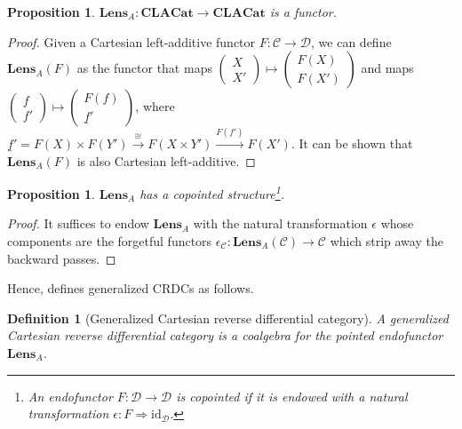 \documentclass[11pt,a4paper,openright,twoside]{report}
\newcounter{mycounter}
\theoremstyle{plain}
\newtheorem{proposition}[mycounter]{Proposition}
\newtheorem{definition}[mycounter]{Definition}
\theoremstyle{definition}
\begin{document}
\begin{proposition}
  $\mathbf{Lens}_A: \mathbf{CLACat} \to \mathbf{CLACat}$ is a functor.
\end{proposition}
\begin{proof}
  Given a Cartesian left-additive functor $F: \mathcal{C} \to \mathcal{D}$, we can define $\mathbf{Lens}_A(F)$ as the functor that maps $\left(\begin{smallmatrix}X  \\ X' \end{smallmatrix}\right) \mapsto \left(\begin{smallmatrix} F(X) \\ F(X') \end{smallmatrix}\right)$ and maps $\left(\begin{smallmatrix}f  \\ f' \end{smallmatrix}\right) \mapsto \left(\begin{smallmatrix} F(f) \\ \underline{f}' \end{smallmatrix}\right)$, where $\underline{f}' = F(X) \times F(Y') \stackrel{\cong}{\longrightarrow} F(X \times Y') \stackrel{F(f')}{\longrightarrow}F(X')$. It can be shown that $\mathbf{Lens}_A(F)$ is also Cartesian left-additive.
\end{proof}

\begin{proposition}
  $\mathbf{Lens}_A$ has a copointed structure\footnote{An endofunctor $F: \mathcal{D} \to \mathcal{D}$ is copointed if it is endowed with a natural transformation $\epsilon: F \Rightarrow \mathrm{id}_{\mathcal{D}}$.}.
\end{proposition}
\begin{proof}
  It suffices to endow $\mathbf{Lens}_A$ with the natural transformation $\epsilon$ whose components are the forgetful functors $\epsilon_{\mathcal{C}}: \mathbf{Lens}_A(\mathcal{C}) \to \mathcal{C}$ which strip away the backward passes.
\end{proof}

Hence, \cite{gavranovic2024fundamental} defines generalized CRDCs as follows.

\begin{definition}[Generalized Cartesian reverse differential category]
  A generalized Cartesian reverse differential category is a coalgebra for the pointed endofunctor $\mathbf{Lens}_A$. 
\end{definition}
\end{document}
